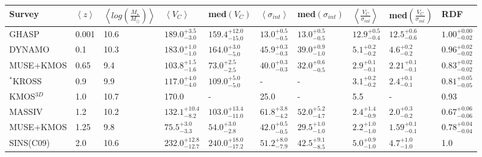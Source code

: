 \documentclass[fleqn,usenatbib]{mnras}
\newcommand{\cmark}{\ding{51}}%
\newcommand{\xmark}{\ding{55}}%
\begin{document}
\begin{table*}
\begin{threeparttable}
\begin{tabular}{llllllllll}
 \hline
Survey & $\left< z \right> $ & $\left< log\left(\frac{M_{\star}}{M_{\odot}}\right)\right>$ & $\left<V_{C}\right>$ & med$\left(V_{C}\right)$ & $ \left< \sigma_{int} \right>$ & med$\left(\sigma_{int}\right)$ & $\left< \frac{V_{C}}{\sigma_{int}} \right>$ & med$\left(\frac{V_{C}}{\sigma_{int}}\right)$ & RDF  \\[1ex]
 \hline
 GHASP & 0.001 & 10.6   &       $189.0^{+3.5}_{-3.0}$ \cmark  & $159.4^{+12.0}_{-15.0}$ &  $13.0^{+0.5}_{-0.5}$ \cmark & $13.0^{+0.5}_{-0.5}$ & $12.9^{+0.5}_{-0.4}$ \cmark &           $12.5^{+0.6}_{-0.6}$&               $1.00^{+0.00}_{-0.02}$  \cmark   \\[1ex]
 DYNAMO & 0.1 & 10.3    &       $183.0^{+1.0}_{-1.0}$ \xmark  & $164.0^{+3.0}_{-5.0}$   &  $45.9^{+0.3}_{-0.3}$ \xmark & $39.0^{+0.9}_{-1.0}$ & $5.1^{+0.2}_{-0.2}$  \xmark &           $4.6^{+0.2}_{-0.2}$ &               $0.96^{+0.02}_{-0.02}$  \xmark   \\[1ex]
 MUSE+KMOS & 0.65 & 9.4 &       $103.8^{+1.5}_{-1.6}$ \xmark  & $73.0^{+2.5}_{-2.5}$    &  $40.0^{+0.3}_{-0.3}$ \cmark & $32.0^{+0.6}_{-0.5}$ & $2.9^{+0.1}_{-0.1}$  \xmark &           $2.21^{+0.1}_{-0.1}$&               $0.83^{+0.02}_{-0.02}$  \xmark   \\[1ex]
 $^{*}$KROSS & 0.9 & 9.9 &      $117.0^{+4.0}_{-4.0}$ \cmark  & $109.0^{+5.0}_{-5.0}$   &  -                    \cmark & -                    & $3.1^{+0.2}_{-0.2}$  \cmark &           $2.4^{+0.1}_{-0.1}$ &               $0.81^{+0.05}_{-0.05}$  \cmark   \\[1ex]
 KMOS$^{3D}$ & 1.0 & 10.7  &     170.0                        &  -                      &  25.0                 \xmark &  -                   & 5.5                  \xmark &            -                  &               0.93                    \xmark   \\[1ex]
 MASSIV & 1.2 & 10.2 &          $132.1^{+10.4}_{-8.2}$ \cmark & $103.0^{+13.4}_{-11.0}$ &  $61.8^{+3.8}_{-4.2}$ \cmark & $52.0^{+5.2}_{-4.7}$ & $2.4^{+1.4}_{-0.9}$  \cmark &           $2.0^{+0.3}_{-0.2}$ &               $0.67^{+0.06}_{-0.06}$  \cmark   \\[1ex]
 MUSE+KMOS & 1.25 & 9.8 &       $75.5^{+3.0}_{-3.3}$   \xmark & $54.0^{+3.0}_{-2.8}$    &  $42.0^{+0.5}_{-0.5}$ \cmark & $29.5^{+1.0}_{-1.0}$ & $2.2^{+1.0}_{-1.0}$  \xmark &           $1.59^{+0.1}_{-0.1}$&               $0.78^{+0.04}_{-0.04}$  \xmark   \\[1ex]
 SINS(C09) & 2.0 & 10.6 &       $232.0^{+12.8}_{-12.7}$\cmark & $240.0^{+18.0}_{-17.2}$ &  $51.2^{+8.0}_{-7.9}$ \cmark & $42.5^{+9.1}_{-8.5}$ & $5.0^{+0.9}_{-1.0}$  \xmark &           $4.7^{+1.0}_{-1.0}$ &               1.0                     \cmark   \\[1ex]

\end{tabular}
\end{threeparttable}
\end{table*}
\end{document}
